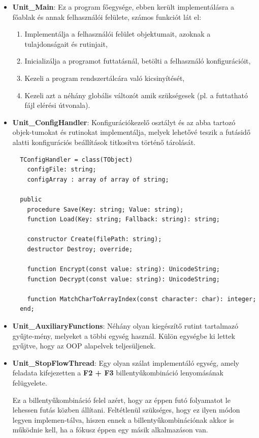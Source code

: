 \begin{itemize}
	\item{
		\textbf{Unit\_Main}: Ez a program főegysége, ebben került implementálásra a főablak és annak felhasználói felülete, számos funkciót lát el:
		\begin{enumerate}
			\item{Implementálja a felhasználói felület objektumait, azoknak a tulajdonságait és rutinjait,}
			\item{Inicializálja a programot futtatásnál, betölti a felhasználó konfigurációit,}
			\item{Kezeli a program rendszertálcára való kicsinyítését,}
			\item{Kezeli azt a néhány globális változót amik szükségesek (pl. a futtatható fájl elérési útvonala).}			
		\end{enumerate}
	}
	\item{
		\textbf{Unit\_ConfigHandler}: Konfigurációkezelő osztályt és az abba tartozó objek\hyp{}tumokat és rutinokat implementálja, melyek lehetővé teszik a futásidő alatti konfigurációs beállítások titkosítva történő tárolását.
		\begin{lstlisting}
  TConfigHandler = class(TObject)
    configFile: string;
    configArray : array of array of string;

  public
    procedure Save(Key: string; Value: string);
    function Load(Key: string; Fallback: string): string;

    constructor Create(filePath: string);
    destructor Destroy; override;

    function Encrypt(const value: string): UnicodeString;
    function Decrypt(const value: string): UnicodeString;

    function MatchCharToArrayIndex(const character: char): integer;
  end;
		\end{lstlisting}
	}
	\item{
		\textbf{Unit\_AuxiliaryFunctions}: Néhány olyan kiegészítő rutint tartalmazó gyűjte\hyp{}mény, melyeket a többi egység használ. Külön egységbe ki lettek gyűjtve, hogy az OOP alapelvek teljesüljenek.
	}
	\item{
		\textbf{Unit\_StopFlowThread}: Egy olyan szálat implementáló egység, amely feladata kifejezetten a \textbf{F2 + F3} billentyűkombináció lenyomásának felügyelete.

		Ez a billentyűkombináció felel azért, hogy az éppen futó folyamatot le lehessen futás közben állítani. Feltétlenül szükséges, hogy ez ilyen módon legyen implemen\hyp{}tálva, hiszen ennek a billentyűkombinációnak akkor is működnie kell, ha a fókusz éppen egy másik alkalmazáson van.

}
\end{itemize}
